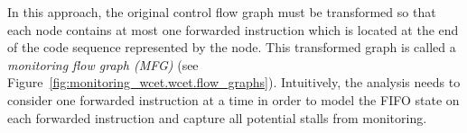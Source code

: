 In this approach, the original control flow graph must be transformed so that
each node contains at most one forwarded instruction which is located at the
end of the code sequence represented by the node.  This transformed graph is
called a {\em monitoring flow graph (MFG)} (see
Figure~\ref{fig:monitoring_wcet.wcet.flow_graphs}).  Intuitively, the analysis
needs to
consider one forwarded instruction at a time in order to model the FIFO state
on each forwarded instruction and capture all potential stalls from monitoring. 


